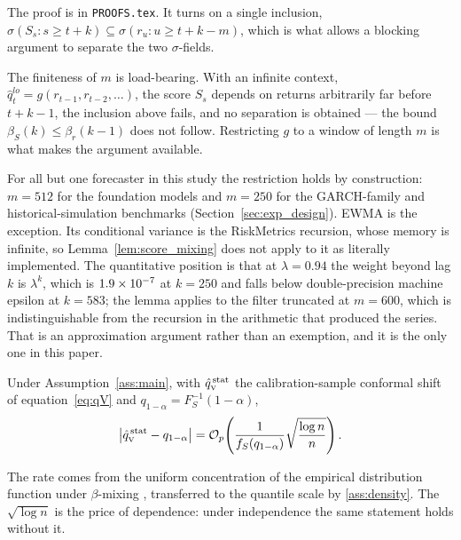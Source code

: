 The proof is in \texttt{PROOFS.tex}. It turns on a single inclusion,
$\sigma(S_s: s\ge t+k)\subseteq\sigma(r_u: u\ge t+k-m)$, which is what allows a
blocking argument to separate the two $\sigma$-fields.

\begin{remark}
	\label{rem:finite_context}
	The finiteness of $m$ is load-bearing. With an infinite context,
	$\hat q_t^{lo} = g(r_{t-1}, r_{t-2},\dots)$, the score $S_s$ depends on
	returns arbitrarily far before $t+k-1$, the inclusion above fails, and no
	separation is obtained --- the bound $\beta_S(k)\le\beta_r(k-1)$ does not
	follow. Restricting $g$ to a window of length $m$ is what makes the argument
	available.

	For all but one forecaster in this study the restriction holds by
	construction: $m = 512$ for the foundation models and $m = 250$ for the
	GARCH-family and historical-simulation benchmarks
	(Section~\ref{sec:exp_design}). EWMA is the exception. Its conditional
	variance is the RiskMetrics recursion, whose memory is infinite, so
	Lemma~\ref{lem:score_mixing} does not apply to it as literally implemented.
	The quantitative position is that at $\lambda = 0.94$ the weight beyond lag
	$k$ is $\lambda^{k}$, which is $1.9\times 10^{-7}$ at $k = 250$ and falls below
	double-precision machine epsilon at $k = 583$; the lemma applies to the filter
	truncated at $m = 600$, which is indistinguishable from the recursion in the
	arithmetic that produced the series. That is an approximation argument rather
	than an exemption, and it is the only one in this paper.
\end{remark}

\begin{lemma}
	\label{lem:quantile_mixing}
	Under Assumption~\ref{ass:main}, with $\hat{q}_{\scriptscriptstyle\mathrm{V}}^{\,\mathrm{stat}}$ the calibration-sample
	conformal shift of equation~\eqref{eq:qV} and
	$q_{1-\alpha} = F_S^{-1}(1-\alpha)$,
	\begin{equation}
		\label{eq:quantile_rate}
		\left|\hat{q}_{\scriptscriptstyle\mathrm{V}}^{\,\mathrm{stat}} - q_{1-\alpha}\right|
		=
		\mathcal O_p\!\left(
		\frac{1}{f_S(q_{1-\alpha})}\sqrt{\frac{\log n}{n}}
		\right).
	\end{equation}
\end{lemma}

The rate comes from the uniform concentration of the empirical distribution
function under $\beta$-mixing \citep[Theorem~2.1]{yu1994rates}
\citep[Theorem~7.2]{rio2017asymptotic}, transferred to the quantile scale by
\ref{ass:density}. The $\sqrt{\log n}$ is the price of dependence: under
independence the same statement holds without it.


